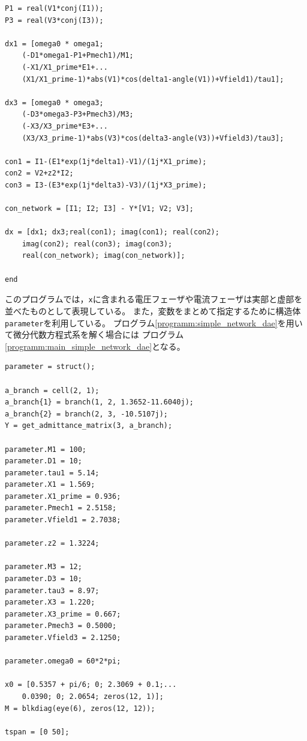 \documentclass[tombow,dvipdfmx]{corona-a5-1.1}
\begin{document}
{\begin{例}[電力系統のシミュレーション]
\begin{PROGRAMA}[count,title={func\_simulation\_3bus.m}]
\begin{verbatim}
P1 = real(V1*conj(I1));
P3 = real(V3*conj(I3));

dx1 = [omega0 * omega1;
    (-D1*omega1-P1+Pmech1)/M1;
    (-X1/X1_prime*E1+...
    (X1/X1_prime-1)*abs(V1)*cos(delta1-angle(V1))+Vfield1)/tau1];

dx3 = [omega0 * omega3;
    (-D3*omega3-P3+Pmech3)/M3;
    (-X3/X3_prime*E3+...
    (X3/X3_prime-1)*abs(V3)*cos(delta3-angle(V3))+Vfield3)/tau3];

con1 = I1-(E1*exp(1j*delta1)-V1)/(1j*X1_prime);
con2 = V2+z2*I2;
con3 = I3-(E3*exp(1j*delta3)-V3)/(1j*X3_prime);

con_network = [I1; I2; I3] - Y*[V1; V2; V3];

dx = [dx1; dx3;real(con1); imag(con1); real(con2);
    imag(con2); real(con3); imag(con3);
    real(con_network); imag(con_network)];

end
\end{verbatim}
\end{PROGRAMA}

このプログラムでは，\verb|x|に含まれる電圧フェーザや電流フェーザは実部と虚部を並べたものとして表現している。
また，変数をまとめて指定するために構造体\verb|parameter|を利用している。
プログラム\ref{programm:simple_network_dae}を用いて微分代数方程式系を解く場合には
プログラム\ref{programm:main_simple_network_dae}となる。

\begin{PROGRAMA}[count,title={main\_simulation\_simple.m}]\label{programm:main_simple_network_dae}
\begin{verbatim}
parameter = struct();

a_branch = cell(2, 1);
a_branch{1} = branch(1, 2, 1.3652-11.6040j);
a_branch{2} = branch(2, 3, -10.5107j);
Y = get_admittance_matrix(3, a_branch);

parameter.M1 = 100;
parameter.D1 = 10;
parameter.tau1 = 5.14;
parameter.X1 = 1.569;
parameter.X1_prime = 0.936;
parameter.Pmech1 = 2.5158;
parameter.Vfield1 = 2.7038;

parameter.z2 = 1.3224;

parameter.M3 = 12;
parameter.D3 = 10;
parameter.tau3 = 8.97;
parameter.X3 = 1.220;
parameter.X3_prime = 0.667;
parameter.Pmech3 = 0.5000;
parameter.Vfield3 = 2.1250;

parameter.omega0 = 60*2*pi;

x0 = [0.5357 + pi/6; 0; 2.3069 + 0.1;...
    0.0390; 0; 2.0654; zeros(12, 1)];
M = blkdiag(eye(6), zeros(12, 12));

tspan = [0 50];


\end{verbatim}
\end{PROGRAMA}
\end{例}}
\end{document}
